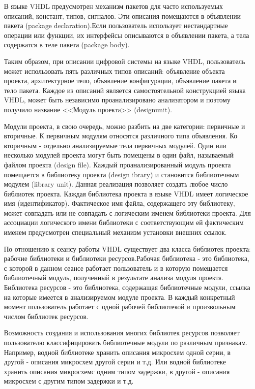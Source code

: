В языке VHDL  предусмотрен механизм пакетов для часто используемых описаний, констант, типов, сигналов. Эти описания помещаются в объявлении пакета (package declaration).Если пользователь использует нестандартные операции или функции, их интерфейсы описываются в объявлении пакета, а тела содержатся в теле пакета (package body).

Таким образом, при описании цифровой системы на языке VHDL,  пользователь может использовать пять различных типов описаний: объявление объекта проекта, архитектурное тело, объявление конфигурации, объявление пакета и тело пакета. Каждое из описаний является самостоятельной конструкцией языка  VHDL, может быть независимо проанализировано анализатором и поэтому получило название <<Модуль проекта>> (designunit).

Модули проекта, в свою очередь, можно разбить на две категории: первичные и вторичные. К первичным модулям относятся различного типа объявления. Ко вторичным  -  отдельно анализируемые тела первичных модулей. Один или несколько модулей проекта могут быть помещены в один файл, называемый файлом проекта (design file). Каждый проанализированный модуль проекта помещается в библиотеку проекта (design ibrary) и становится библиотечным модулем (library unit). Данная реализация позволяет создать любое число библиотек проекта. Каждая библиотека проекта в языке  VHDL имеет логическое имя (идентификатор). Фактическое имя файла, содержащего эту библиотеку, может совпадать или не совпадать с логическим именем библиотеки проекта. Для ассоциации логического имени библиотеки с соответствующим ей фактическим именем предусмотрен специальный механизм установки внешних ссылок.

По отношению к сеансу работы  VHDL существует два класса библиотек проекта: рабочие библиотеки и библиотеки ресурсов.Рабочая библиотека  -  это библиотека, с которой в данном сеансе работает пользователь и в которую помещается библиотечный модуль, полученный в результате анализа модуля проекта. Библиотека ресурсов  -  это библиотека, содержащая библиотечные модули, ссылка на которые имеется в анализируемом модуле проекта. В каждый конкретный момент пользователь работает с одной рабочей библиотекой и произвольным числом библиотек ресурсов.

Возможность создания и использования многих библиотек ресурсов позволяет пользователю классифицировать библиотечные модули по различным признакам. Например, водной библиотеке хранить описания микросхем одной серии, в другой  -  описания микросхем другой серии и т.д.    Или водной библиотеке хранить описания микросхемс одним типом задержки,  в другой  -  описания микросхем с другим типом задержки и т.д.
